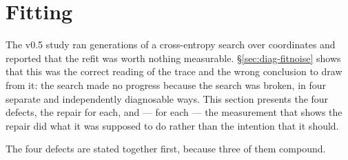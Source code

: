 \section{Fitting}
\label{sec:fitting}

The v0.5 study ran \numFitTraceGensVfive{} generations of a cross-entropy search over
\numVfiveParams{} coordinates and reported that the refit was worth nothing
measurable. \S\ref{sec:diag-fitnoise} shows that this was the correct reading of
the trace and the wrong conclusion to draw from it: the search made no progress
because the search was broken, in four separate and independently diagnosable
ways. This section presents the four defects, the repair for each, and --- for
each --- the measurement that shows the repair did what it was supposed to do
rather than the intention that it should.

The four defects are stated together first, because three of them compound.

